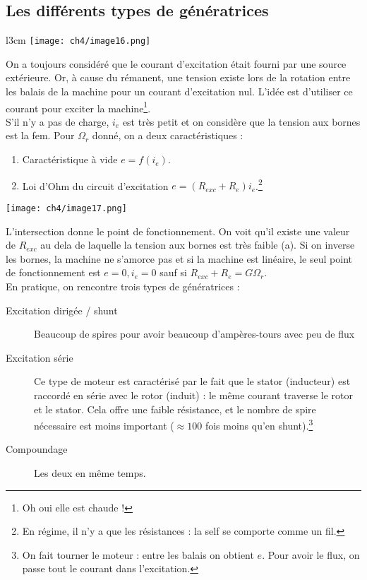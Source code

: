 	\subsection{Les différents types de génératrices}
	\begin{wrapfigure}[7]{l}{3cm}
	\vspace{-5mm}
	\texttt{[image: ch4/image16.png]}
	\end{wrapfigure}
	On a toujours considéré que le courant d'excitation était fourni par une source 
	extérieure. Or, à cause du rémanent, une tension existe lors de la rotation entre 
	les balais de la machine pour un courant d'excitation nul. L'idée est d'utiliser 
	ce courant pour exciter la machine\footnote{Oh oui elle est chaude !}.\\
	S'il n'y a pas de charge, $i_e$ est très petit et on considère que la tension aux 
	bornes est la fem. Pour $\Omega_r$ donné, on a deux caractéristiques :
	\begin{enumerate}
	\item Caractéristique à vide $e = f(i_e)$.
	\item Loi d'Ohm du circuit d’excitation $e=(R_{exc}+R_e)i_e$.\footnote{En régime, 
	il n'y a que les résistances : la self se comporte comme un fil.}
	\end{enumerate}
	\begin{center}
	\texttt{[image: ch4/image17.png]}
	\end{center}
	L'intersection donne le point de fonctionnement. On voit qu'il existe une valeur 
	de $R_{exc}$ au dela de laquelle la tension aux bornes est très faible (a). Si 
	on inverse les bornes, la machine ne s'amorce pas et si la machine est linéaire, 
	le seul point de fonctionnement est $e=0,i_e=0$ sauf si $R_{exc}+R_e=G\Omega_r$.\\
	
	En pratique, on rencontre trois types de génératrices :
	\begin{description}
	\item[Excitation dirigée / shunt] Beaucoup de spires pour avoir beaucoup 
	d'ampères-tours avec peu de flux
	\item[Excitation série] Ce type de moteur est caractérisé par le fait que 
	le stator (inducteur) est raccordé en série avec le rotor (induit) : le même 
	courant traverse le rotor et le stator. Cela offre une faible résistance, et 
	le nombre de spire nécessaire est moins important ($\approx 100$ fois moins qu'en 
	shunt).\footnote{ On fait tourner le moteur : entre les balais on obtient $e$. Pour avoir 
	le flux, on passe tout le courant dans l'excitation.}
	\item[Compoundage] Les deux en même temps.
	\end{description}
	
